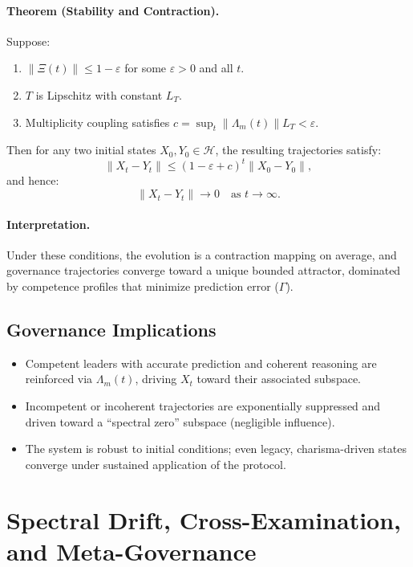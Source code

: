 \documentclass[11pt]{article}
\begin{document}
\paragraph{Theorem (Stability and Contraction).}
Suppose:
\begin{enumerate}[leftmargin=1.5em]
    \item \(\|\Xi(t)\| \leq 1 - \varepsilon\) for some \(\varepsilon > 0\) and all \(t\).
    \item \(T\) is Lipschitz with constant \(L_T\).
    \item Multiplicity coupling satisfies \(c = \sup_t \|\Lambda_m(t)\| L_T < \varepsilon\).
\end{enumerate}
Then for any two initial states \(X_0, Y_0 \in \mathcal{H}\), the resulting trajectories satisfy:
\[
  \|X_t - Y_t\| \leq (1 - \varepsilon + c)^t \|X_0 - Y_0\|,
\]
and hence:
\[
  \|X_t - Y_t\| \to 0 \quad \text{as } t \to \infty.
\]

\paragraph{Interpretation.}
Under these conditions, the evolution is a contraction mapping on average, and governance trajectories converge toward a unique bounded attractor, dominated by competence profiles that minimize prediction error (\(\Gamma\)).

\subsection{Governance Implications}

\begin{itemize}[leftmargin=1.5em]
    \item Competent leaders with accurate prediction and coherent reasoning are reinforced via \(\Lambda_m(t)\), driving \(X_t\) toward their associated subspace.
    \item Incompetent or incoherent trajectories are exponentially suppressed and driven toward a ``spectral zero'' subspace (negligible influence).
    \item The system is robust to initial conditions; even legacy, charisma-driven states converge under sustained application of the protocol.
\end{itemize}

\section{Spectral Drift, Cross-Examination, and Meta-Governance}
\end{document}
